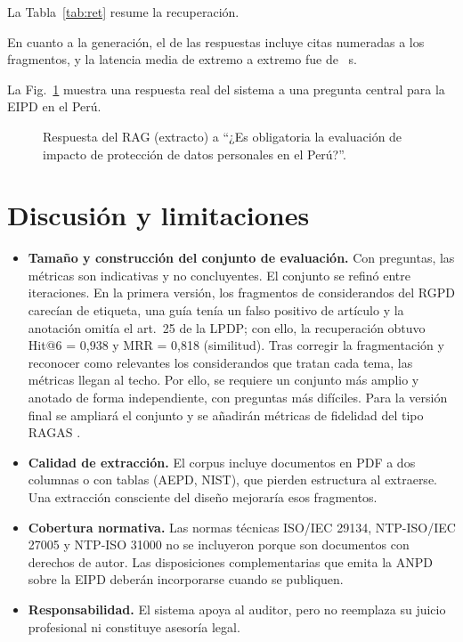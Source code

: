 \documentclass[conference]{IEEEtran}
\begin{document}
La Tabla~\ref{tab:ret} resume la recuperación. \AnalisisRecuperacion

En cuanto a la generación, el \PctCitas{} de las respuestas incluye citas numeradas a los fragmentos, y la latencia media de extremo a extremo fue de \LatGen{}~s. \AnalisisGeneracion

La Fig.~\ref{fig:ejemplo} muestra una respuesta real del sistema a una pregunta central para la EIPD en el Perú.

\begin{figure}[t]

\caption{Respuesta del RAG (extracto) a ``¿Es obligatoria la evaluación de impacto de protección de datos personales en el Perú?''.}
\label{fig:ejemplo}
\end{figure}

\section{Discusión y limitaciones}
\begin{itemize}
  \item \textbf{Tamaño y construcción del conjunto de evaluación.} Con \NumPreguntas{} preguntas, las métricas son indicativas y no concluyentes. El conjunto se refinó entre iteraciones. En la primera versión, los fragmentos de considerandos del RGPD carecían de etiqueta, una guía tenía un falso positivo de artículo y la anotación omitía el art.~25 de la LPDP; con ello, la recuperación obtuvo Hit@6 = 0{,}938 y MRR = 0{,}818 (similitud). Tras corregir la fragmentación y reconocer como relevantes los considerandos que tratan cada tema, las métricas llegan al techo. Por ello, se requiere un conjunto más amplio y anotado de forma independiente, con preguntas más difíciles. Para la versión final se ampliará el conjunto y se añadirán métricas de fidelidad del tipo RAGAS \cite{es2023ragas}.
  \item \textbf{Calidad de extracción.} El corpus incluye documentos en PDF a dos columnas o con tablas (AEPD, NIST), que pierden estructura al extraerse. Una extracción consciente del diseño mejoraría esos fragmentos.
  \item \textbf{Cobertura normativa.} Las normas técnicas ISO/IEC 29134, NTP-ISO/IEC 27005 y NTP-ISO 31000 no se incluyeron porque son documentos con derechos de autor. Las disposiciones complementarias que emita la ANPD sobre la EIPD deberán incorporarse cuando se publiquen.
  \item \textbf{Responsabilidad.} El sistema apoya al auditor, pero no reemplaza su juicio profesional ni constituye asesoría legal.
\end{itemize}
\end{document}
